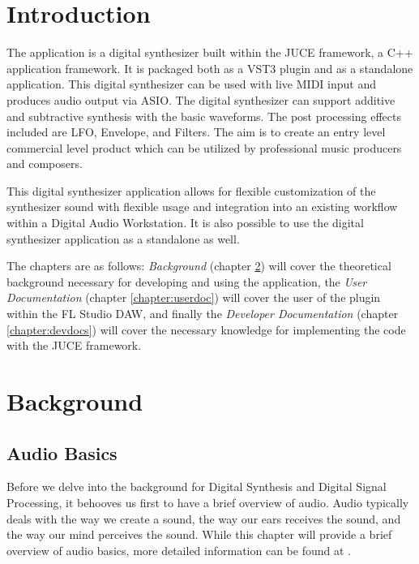 \documentclass[a4paper,12pt]{report}
\begin{document}



\vspace*{\fill}
\begin{center}

\end{center}
\vfill
\thispagestyle{empty}
\newpage
\setcounter{page}{1}

\tableofcontents

\chapter{Introduction}
\label{chapter:intro}

The application is a digital synthesizer built within the JUCE framework, a C++ application framework. It is packaged both as a VST3 plugin and as a standalone application. This digital synthesizer can be used with live MIDI input and produces audio output via ASIO. The digital synthesizer can support additive and subtractive synthesis with the basic waveforms. The post processing effects included are LFO, Envelope, and Filters. The aim is to create an entry level commercial level product which can be utilized by professional music producers and composers.

This digital synthesizer application allows for flexible customization of the synthesizer sound with flexible usage and integration into an existing workflow within a Digital Audio Workstation. It is also possible to use the digital synthesizer application as a standalone as well.

The chapters are as follows: \emph{Background} (chapter \ref{chapter:background}) will cover the theoretical background necessary for developing and using the application, the \emph{User Documentation} (chapter \ref{chapter:userdoc}) will cover the user of the plugin within the FL Studio DAW, and finally the \emph{Developer Documentation} (chapter \ref{chapter:devdocs}) will cover the necessary knowledge for implementing the code with the JUCE framework.


\chapter{Background}
\label{chapter:background}
\section{Audio Basics}
\label{sec:audiobasics}
Before we delve into the background for Digital Synthesis and Digital Signal Processing, it behooves us first to have a brief overview of audio. Audio typically deals with the way we create a sound, the way our ears receives the sound, and the way our mind perceives the sound. While this chapter will provide a brief overview of audio basics, more detailed information can be found at \cite{beginneraudiosynthesis}.
\end{document}
